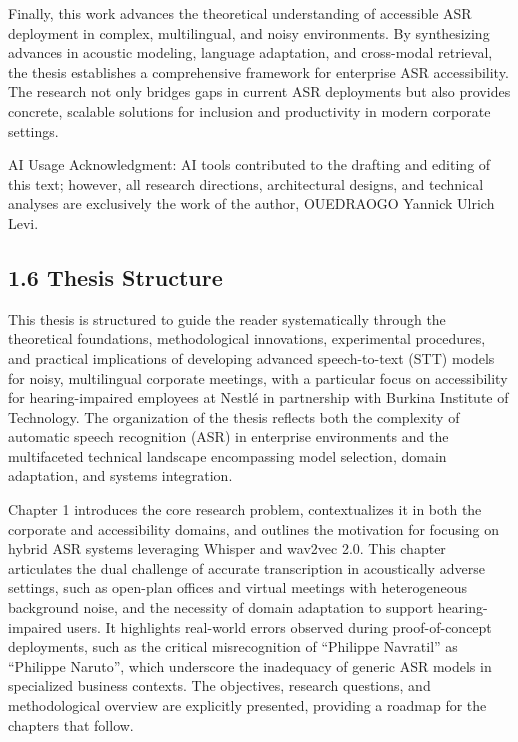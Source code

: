 \documentclass[12pt,a4paper]{article}
\begin{document}
Finally, this work advances the theoretical understanding of accessible ASR deployment in complex, multilingual, and noisy environments. By synthesizing advances in acoustic modeling, language adaptation, and cross-modal retrieval, the thesis establishes a comprehensive framework for enterprise ASR accessibility. The research not only bridges gaps in current ASR deployments but also provides concrete, scalable solutions for inclusion and productivity in modern corporate settings.


AI Usage Acknowledgment: AI tools contributed to the drafting and editing of this text; however, all research directions, architectural designs, and technical analyses are exclusively the work of the author, OUEDRAOGO Yannick Ulrich Levi.


\subsection{1.6 Thesis Structure}


This thesis is structured to guide the reader systematically through the theoretical foundations, methodological innovations, experimental procedures, and practical implications of developing advanced speech-to-text (STT) models for noisy, multilingual corporate meetings, with a particular focus on accessibility for hearing-impaired employees at Nestlé in partnership with Burkina Institute of Technology. The organization of the thesis reflects both the complexity of automatic speech recognition (ASR) in enterprise environments and the multifaceted technical landscape encompassing model selection, domain adaptation, and systems integration.


Chapter 1 introduces the core research problem, contextualizes it in both the corporate and accessibility domains, and outlines the motivation for focusing on hybrid ASR systems leveraging Whisper and wav2vec 2.0. This chapter articulates the dual challenge of accurate transcription in acoustically adverse settings, such as open-plan offices and virtual meetings with heterogeneous background noise, and the necessity of domain adaptation to support hearing-impaired users. It highlights real-world errors observed during proof-of-concept deployments, such as the critical misrecognition of “Philippe Navratil” as “Philippe Naruto”, which underscore the inadequacy of generic ASR models in specialized business contexts. The objectives, research questions, and methodological overview are explicitly presented, providing a roadmap for the chapters that follow.
\end{document}
